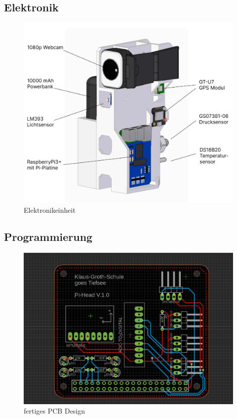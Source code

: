 \documentclass[11pt]{article}
\begin{document}
\subsection{Elektronik}
\begingroup
\begin{figure}
\centering
  \includegraphics[width=\linewidth]{Sensoris.jpg}
  \caption{Elektronikeinheit}
\end{figure}
\Elektronik

\endgroup

\subsection{Programmierung}
\begingroup
\begin{figure}
\centering
  \includegraphics[width=\linewidth]{Board.png}
  \caption{fertiges PCB Design}
\end{figure}
\Programmierung
\end{document}
